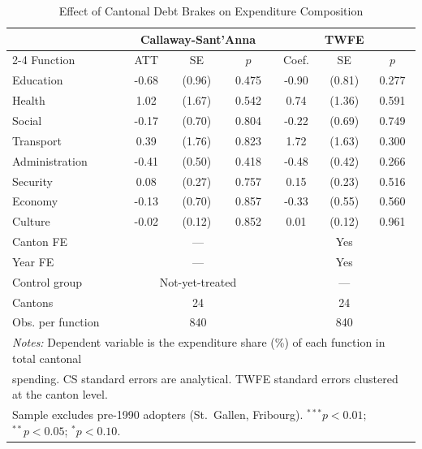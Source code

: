 \begin{table}[htbp]
\centering
\caption{Effect of Cantonal Debt Brakes on Expenditure Composition}
\label{tab:main}
\begin{tabular}{lcccccc}
\hline\hline
 & \multicolumn{3}{c}{Callaway-Sant'Anna} & \multicolumn{3}{c}{TWFE} \\
\cline{2-4} \cline{5-7}
Function & ATT & SE & $p$ & Coef. & SE & $p$ \\
\hline
Education & -0.68 & (0.96) & 0.475 & -0.90 & (0.81) & 0.277 \\
Health & 1.02 & (1.67) & 0.542 & 0.74 & (1.36) & 0.591 \\
Social & -0.17 & (0.70) & 0.804 & -0.22 & (0.69) & 0.749 \\
Transport & 0.39 & (1.76) & 0.823 & 1.72 & (1.63) & 0.300 \\
Administration & -0.41 & (0.50) & 0.418 & -0.48 & (0.42) & 0.266 \\
Security & 0.08 & (0.27) & 0.757 & 0.15 & (0.23) & 0.516 \\
Economy & -0.13 & (0.70) & 0.857 & -0.33 & (0.55) & 0.560 \\
Culture & -0.02 & (0.12) & 0.852 & 0.01 & (0.12) & 0.961 \\
\hline
Canton FE & \multicolumn{3}{c}{---} & \multicolumn{3}{c}{Yes} \\
Year FE & \multicolumn{3}{c}{---} & \multicolumn{3}{c}{Yes} \\
Control group & \multicolumn{3}{c}{Not-yet-treated} & \multicolumn{3}{c}{---} \\
Cantons & \multicolumn{3}{c}{24} & \multicolumn{3}{c}{24} \\
Obs. per function & \multicolumn{3}{c}{840} & \multicolumn{3}{c}{840} \\
\hline
\multicolumn{7}{l}{\footnotesize \textit{Notes:} Dependent variable is the expenditure share (\%) of each function in total cantonal} \\
\multicolumn{7}{l}{\footnotesize spending. CS standard errors are analytical. TWFE standard errors clustered at the canton level.} \\
\multicolumn{7}{l}{\footnotesize Sample excludes pre-1990 adopters (St.\ Gallen, Fribourg). $^{***}p<0.01$; $^{**}p<0.05$; $^{*}p<0.10$.} \\
\hline\hline
\end{tabular}
\end{table}
